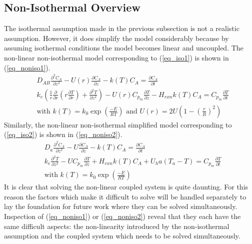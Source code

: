 \documentclass[11pt,fleqn]{article}
\theoremstyle{defstyle}
\begin{document}
\subsection{Non-Isothermal Overview}
\label{section_noniso}
The isothermal assumption made in the previous subsection is not a realistic assumption. However, it does simplify the model considerably because by assuming isothermal conditions the model becomes linear and uncoupled. The non-linear non-isothermal model corresponding to (\ref{eq_iso1}) is shown in (\ref{eq_noniso1}).
\begin{equation}
\begin{aligned}
&D_{AB} \frac{\partial^2 C_A}{\partial z^2} - U(r) \frac{\partial C_A}{\partial z} - k(T)C_A 
= \frac{\partial C_A}{\partial t} \\
& k_e(\frac{1}{r}\frac{\partial}{\partial r}(r\frac{\partial T}{\partial r}) + \frac{\partial ^2 T}{\partial z^2}) - U(r) C_{p_m} \frac{\partial T}{\partial z} - H_{rxn}k(T)C_A = C_{p_m} \frac{\partial T}{\partial t} \\
&\text{with } k(T) = k_0 \exp(\frac{-E}{RT}) \text{ and } U(r)=2U(1-(\frac{r}{R})^2)
\end{aligned}
\label{eq_noniso1}
\end{equation} 
Similarly, the non-linear non-isothermal simplified model corresponding to (\ref{eq_iso2}) is shown in (\ref{eq_noniso2}).
\begin{equation}
\begin{aligned}
&D_a \frac{\partial^2 C_A}{\partial z^2} - U \frac{\partial C_A}{\partial z} - k(T)C_A 
= \frac{\partial C_A}{\partial t} \\
& k_e\frac{\partial^2 T}{\partial z^2}- U C_{p_m} \frac{\partial T}{\partial z} + H_{rxn}k(T)C_A  + U_ha(T_a-T) = C_{p_m} 
\frac{\partial T}{\partial t} \\
&\text{with } k(T) = k_0 \exp(\frac{-E}{RT})
\end{aligned}
\label{eq_noniso2}
\end{equation} 
It is clear that solving the non-linear coupled system is quite daunting. For this reason the factors which make it difficult to solve will be handled separately to lay the foundation for future work where they can be solved simultaneously. Inspection of (\ref{eq_noniso1}) or (\ref{eq_noniso2}) reveal that they each have the same difficult aspects: the non-linearity introduced by the non-isothermal assumption and the coupled system which needs to be solved simultaneously.
\end{document}
